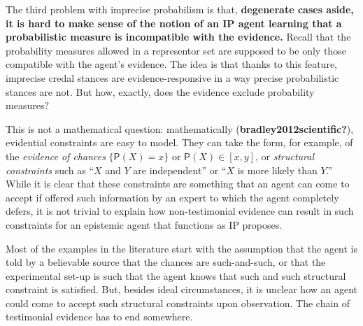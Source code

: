\documentclass[
  letterpaper,
  DIV=11,
  numbers=noendperiod]{scrartcl}
\begin{document}
The third problem with imprecise probabilism is that, \textbf{degenerate
cases aside, it is hard to make sense of the notion of an IP agent
learning that a probabilistic measure is incompatible with the
evidence.} Recall that the probability measures allowed in a representor
set are supposed to be only those compatible with the agent's evidence.
The idea is that thanks to this feature, imprecise credal stances are
evidence-responsive in a way precise probabilistic stances are not. But
how, exactly, does the evidence exclude probability measures?

This is not a mathematical question: mathematically
(\textbf{bradley2012scientific?}), evidential constraints are easy to
model. They can take the form, for example, of the
\emph{evidence of chances} \(\{ \mathsf{P}(X) = x\}\) or
\(\mathsf{P}(X) \in [x,y]\), or \emph{structural constraints} such as
``\(X\) and \(Y\) are independent'' or ``\(X\) is more likely than
\(Y\).'' While it is clear that these constraints are something that an
agent can come to accept if offered such information by an expert to
which the agent completely defers, it is not trivial to explain how
non-testimonial evidence can result in such constraints for an epistemic
agent that functions as IP proposes.

Most of the examples in the literature start with the assumption that
the agent is told by a believable source that the chances are
such-and-such, or that the experimental set-up is such that the agent
knows that such and such structural constraint is satisfied. But,
besides ideal circumstances, it is unclear how an agent could come to
accept such structural constraints upon observation. The chain of
testimonial evidence has to end somewhere.
\end{document}

